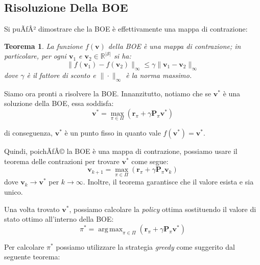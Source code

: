 ﻿\documentclass[11pt, a4paper]{report}
\newtheorem{theorem}{Teorema}
\DeclareMathOperator*{\argmax}{arg\,max}
\begin{document}
\subsection{Risoluzione Della BOE}

Si puÃƒÂ² dimostrare che la BOE è effettivamente una mappa di contrazione:

\begin{theorem}
La funzione $f(\bm{v})$ della BOE è una mappa di contrazione; in particolare, per ogni $\bm{v}_1$ e $\bm{v}_2 \in \mathbb{R}^{|\mathcal{S}|}$ si ha:
\begin{equation}
\| f(\bm{v}_1) - f(\bm{v}_2) \|_\infty \le \gamma \| \bm{v}_1 - \bm{v}_2 \|_\infty
\end{equation}
dove $\gamma$ è il fattore di sconto e $\|\cdot\|_\infty$ è la norma massimo.
\end{theorem}

Siamo ora pronti a risolvere la BOE. Innanzitutto, notiamo che se $\bm{v}^*$ è una soluzione della BOE, essa soddisfa:
\begin{equation}
\bm{v}^* = \max_{\pi \in \Pi} (\bm{r}_\pi + \gamma \bm{P}_\pi \bm{v}^*)
\end{equation}

\newpage

di conseguenza, $\bm{v}^*$ è un punto fisso in quanto vale $f(\bm{v}^*) = \bm{v}^*$.

Quindi, poichÃƒÂ© la BOE è una mappa di contrazione, possiamo usare il teorema delle contrazioni per trovare $\bm{v}^*$ come segue:
\begin{equation}
\bm{v}_{k+1} = \max_{\pi \in \Pi} (\bm{r}_\pi + \gamma \bm{P}_\pi \bm{v}_k)
\end{equation}
dove $\bm{v}_k \to \bm{v}^*$ per $k \to \infty$. Inoltre, il teorema garantisce che il valore esista e sia unico.

Una volta trovato $\bm{v}^*$, possiamo calcolare la \emph{policy} ottima sostituendo il valore di stato ottimo all'interno della BOE:
\begin{equation}
\pi^* = \argmax_{\pi \in \Pi} (\bm{r}_\pi + \gamma \bm{P}_\pi \bm{v}^*)
\end{equation}

Per calcolare $\pi^*$ possiamo utilizzare la strategia \emph{greedy} come suggerito dal seguente teorema:
\end{document}
